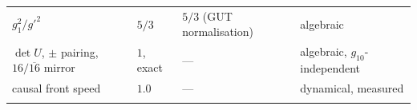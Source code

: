 \documentclass[aps,prd,amsmath,amssymb,superscriptaddress,longbibliography,floatfix,preprint]{revtex4-2}
\begin{document}
{\begin{longtable}{llll}
\arrayrulecolor{black!40}\hline\arrayrulecolor{black}
\parbox[c]{2.63cm}{\vspace{2.5pt}\raggedright {} \mbox{$g_1^2/g'^2$}\vspace{2.5pt}} & \parbox[c]{4.21cm}{\vspace{2.5pt}\raggedright {} \mbox{$5/3$}\vspace{2.5pt}} & \parbox[c]{3.01cm}{\vspace{2.5pt}\raggedright {} \mbox{$5/3$} (GUT normalisation)\vspace{2.5pt}} & \parbox[c]{4.8cm}{\vspace{2.5pt}\raggedright {} algebraic\vspace{2.5pt}} \\
\hline{}
\parbox[c]{2.63cm}{\vspace{2.5pt}\raggedright {} \mbox{$\det U$}, \mbox{$\pm$} pairing, \mbox{$16/\overline{16}$} mirror\vspace{2.5pt}} & \parbox[c]{4.21cm}{\vspace{2.5pt}\raggedright {} \mbox{$1$}, exact\vspace{2.5pt}} & \parbox[c]{3.01cm}{\vspace{2.5pt}\raggedright {} ---\vspace{2.5pt}} & \parbox[c]{4.8cm}{\vspace{2.5pt}\raggedright {} algebraic, \mbox{$g_{10}$}-independent\vspace{2.5pt}} \\
\hline{}
\parbox[c]{2.63cm}{\vspace{2.5pt}\raggedright {} causal front speed\vspace{2.5pt}} & \parbox[c]{4.21cm}{\vspace{2.5pt}\raggedright {} \mbox{$1.0$}\vspace{2.5pt}} & \parbox[c]{3.01cm}{\vspace{2.5pt}\raggedright {} ---\vspace{2.5pt}} & \parbox[c]{4.8cm}{\vspace{2.5pt}\raggedright {} dynamical, measured\vspace{2.5pt}} \\
\hline{}

\end{longtable}}
\end{document}
